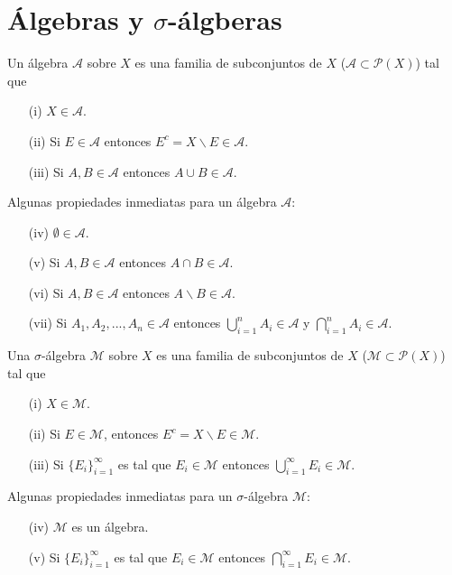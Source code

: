 \section{Álgebras y $\sigma$-álgberas}
\begin{defi}
    Un álgebra $\mathcal{A}$ sobre $X$ es una familia de subconjuntos de $X$ ($\mathcal{A} \subset \mathcal{P}(X)$) tal que
    \begin{enumerate}
        \item[(i)] $X \in \mathcal{A}$.
        \item[(ii)] Si $E \in \mathcal{A}$ entonces $E^c = X \backslash E \in \mathcal{A}$.
        \item[(iii)] Si $A, B \in \mathcal{A}$ entonces $A \cup B \in \mathcal{A}$.
    \end{enumerate}
\end{defi}
Algunas propiedades inmediatas para un álgebra $\mathcal{A}$:
\begin{enumerate}
    \item[(iv)] $\emptyset \in \mathcal{A}$.
    \item[(v)] Si $A, B \in \mathcal{A}$ entonces $A \cap B \in \mathcal{A}$.
    \item[(vi)] Si $A, B \in \mathcal{A}$ entonces $A \backslash B \in \mathcal{A}$.
    \item[(vii)] Si $A_1, A_2,..., A_n \in \mathcal{A}$ entonces $\bigcup_{i=1}^{n}{A_i} \in \mathcal{A}$ y $\bigcap_{i=1}^{n}{A_i} \in \mathcal{A}$.
\end{enumerate}
\begin{defi}
    Una $\sigma$-álgebra $\mathcal{M}$ sobre $X$ es una familia de subconjuntos de $X$ ($\mathcal{M} \subset \mathcal{P}(X)$) tal que
    \begin{enumerate}
        \item[(i)] $X \in \mathcal{M}$.
        \item[(ii)] Si $E \in \mathcal{M}$, entonces $E^c = X \backslash E \in \mathcal{M}$.
        \item[(iii)] Si $\{E_i\}_{i=1}^{\infty}$ es tal que $E_i \in \mathcal{M}$ entonces $\bigcup_{i=1}^{\infty}{E_i} \in \mathcal{M}$.
    \end{enumerate}
\end{defi}
Algunas propiedades inmediatas para un $\sigma$-álgebra $\mathcal{M}$:
\begin{enumerate}
    \item[(iv)] $\mathcal{M}$ es un álgebra.
    \item[(v)] Si $\{E_i\}_{i=1}^{\infty}$ es tal que $E_i \in \mathcal{M}$ entonces $\bigcap_{i=1}^{\infty}{E_i} \in \mathcal{M}$.
\end{enumerate}
